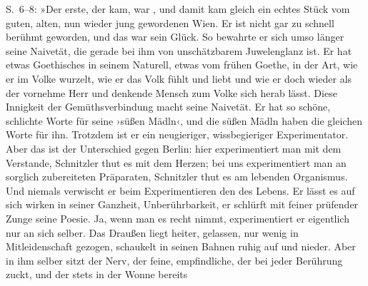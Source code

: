 \begin{ledgroupsized}[t]{13cm}
{{{                     S. 6–8: »Der erste, der kam, war , und damit kam gleich ein echtes Stück vom guten, alten, nun
                     wieder jung gewordenen Wien. Er ist nicht
                     gar zu schnell berühmt geworden, und das war sein Glück. So bewahrte er sich
                     umso länger seine Naivetät, die gerade bei ihm von unschätzbarem Juwelenglanz
                     ist. Er hat etwas Goethisches in seinem
                     Naturell, etwas vom frühen Goethe, in
                     der Art, wie er im Volke wurzelt, wie er das Volk fühlt und liebt und wie er
                     doch wieder als der vornehme Herr und denkende Mensch zum Volke sich herab
                     lässt. Diese Innigkeit der Gemüthsverbindung macht seine Naivetät. Er hat so
                     schöne, schlichte Worte für seine ›süßen Mädln‹, und die süßen Mädln haben die
                     gleichen Worte für ihn. Trotzdem ist er ein neugieriger, wissbegieriger
                     Experimentator. Aber das ist der Unterschied gegen Berlin: hier experimentiert man mit dem Verstande, Schnitzler thut es mit dem Herzen; bei uns
                     experimentiert man an sorglich zubereiteten Präparaten, Schnitzler thut es am lebenden Organismus. Und niemals
                     verwischt er beim Experimentieren den  des
                     Lebens. Er lässt es auf sich wirken in seiner Ganzheit, Unberührbarkeit, er
                     schlürft mit feiner prüfender Zunge seine Poesie. Ja, wenn man es recht nimmt,
                     experimentiert er eigentlich nur an sich selber. Das Draußen liegt heiter,
                     gelassen, nur wenig in Mitleidenschaft gezogen, schaukelt in seinen Bahnen
                     ruhig auf und nieder. Aber in ihm selber sitzt der Nerv, der feine,
                     empfindliche, der bei jeder Berührung zuckt, und der stets in der Wonne bereits
}}}
\end{ledgroupsized}
